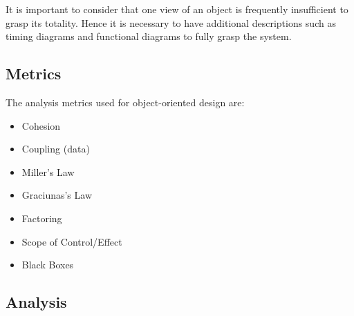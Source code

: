 \documentclass{article}
\begin{document}
		It is important to consider that one view of an object is frequently insufficient to grasp its totality. Hence it is necessary to have additional descriptions such as timing diagrams and functional diagrams to fully grasp the system. 
	\subsection{Metrics}
		The analysis metrics used for object-oriented design are:
		\begin{itemize}
			\item Cohesion
			\item Coupling (data)
			\item Miller's Law
			\item Graciunas's Law
			\item Factoring
			\item Scope of Control/Effect
			\item Black Boxes
		\end{itemize}
	\subsection{Analysis}
\end{document}
